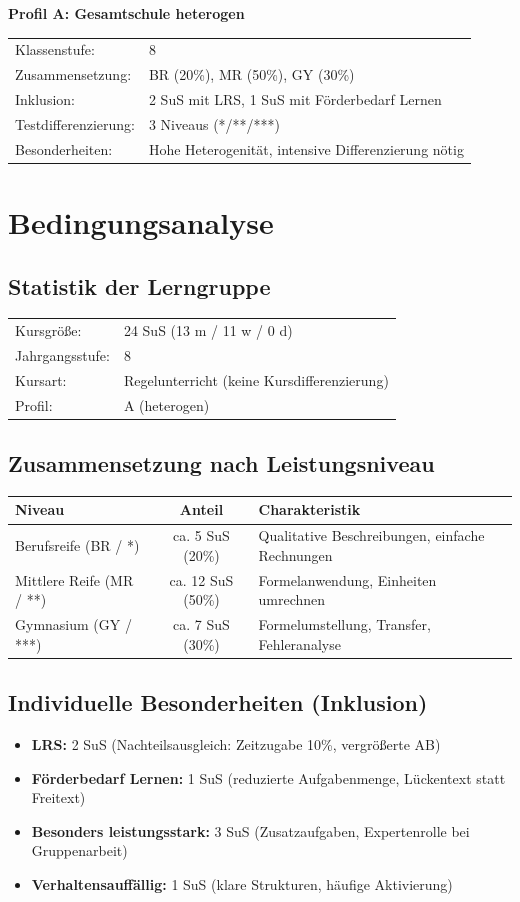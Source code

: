\documentclass[11pt,a4paper]{article}
\newcommand{\profilbeschreibung}{%
    \textbf{Profil A: Gesamtschule heterogen}\\[0.5em]
    \begin{tabular}{ll}
        Klassenstufe: & 8 \\
        Zusammensetzung: & BR (20\%), MR (50\%), GY (30\%) \\
        Inklusion: & 2 SuS mit LRS, 1 SuS mit Förderbedarf Lernen \\
        Testdifferenzierung: & 3 Niveaus (*/**/***) \\
        Besonderheiten: & Hohe Heterogenität, intensive Differenzierung nötig
    \end{tabular}
}
\begin{document}
\begin{profilbox}
\profilbeschreibung
\end{profilbox}

\section{Bedingungsanalyse}

\subsection{Statistik der Lerngruppe}
\begin{tabular}{ll}
    Kursgröße: & 24 SuS (13 m / 11 w / 0 d) \\
    Jahrgangsstufe: & 8 \\
    Kursart: & Regelunterricht (keine Kursdifferenzierung) \\
    Profil: & A (heterogen) \\
\end{tabular}

\subsection{Zusammensetzung nach Leistungsniveau}
\begin{tabular}{|l|c|l|}
\hline
\textbf{Niveau} & \textbf{Anteil} & \textbf{Charakteristik} \\
\hline
Berufsreife (BR / *) & ca. 5 SuS (20\%) & Qualitative Beschreibungen, einfache Rechnungen \\
\hline
Mittlere Reife (MR / **) & ca. 12 SuS (50\%) & Formelanwendung, Einheiten umrechnen \\
\hline
Gymnasium (GY / ***) & ca. 7 SuS (30\%) & Formelumstellung, Transfer, Fehleranalyse \\
\hline
\end{tabular}

\subsection{Individuelle Besonderheiten (Inklusion)}
\begin{itemize}
    \item \textbf{LRS:} 2 SuS (Nachteilsausgleich: Zeitzugabe 10\%, vergrößerte AB)
    \item \textbf{Förderbedarf Lernen:} 1 SuS (reduzierte Aufgabenmenge, Lückentext statt Freitext)
    \item \textbf{Besonders leistungsstark:} 3 SuS (Zusatzaufgaben, Expertenrolle bei Gruppenarbeit)
    \item \textbf{Verhaltensauffällig:} 1 SuS (klare Strukturen, häufige Aktivierung)
\end{itemize}
\end{document}
